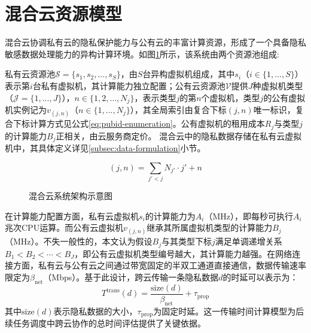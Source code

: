 \section{混合云资源模型}\label{sec:cloud-define}

混合云协调私有云的隐私保护能力与公有云的丰富计算资源，形成了一个具备隐私敏感数据处理能力的异构计算环境。如图\ref{fig:hybrid-arch}所示，该系统由两个资源池组成:

私有云资源池$\mathcal{S} = \{s_1, s_2, ..., s_S\}$，由$S$台异构虚拟机组成，其中$s_i$（$i \in \{1,...,S\}$）表示第$i$台私有虚拟机，其计算能力独立配置；公有云资源池$\mathcal{V}$提供$J$种虚拟机类型（$\mathcal{J} = \{1,...,J\}$），\(n \in \{1,2,\dots,N_j\}\)，表示类型\(j\)的第\(n\)个虚拟机，类型$j$的公有虚拟机实例记为$v_{(j,n)}$（$n \in \{1,...,N_j\}$），其全局索引由复合下标$(j,n)$唯一标识，复合下标计算方式见公式\eqref{eq:pubid-enumeration}。公有虚拟机的租用成本$R_j$与类型$j$的计算能力$B_j$正相关，由云服务商定价。
混合云中的隐私数据存储在私有云虚拟机中，其具体定义详见\ref{subsec:data-formulation}小节。

\begin{equation}
    (j,n) = \sum_{j'<j} N_{j'} \cdot j' + n
    \label{eq:pubid-enumeration}
\end{equation}

\begin{figure}[htb]
    \centering
    
    \caption{混合云系统架构示意图}
    \label{fig:hybrid-arch}
\end{figure}

在计算能力配置方面，私有云虚拟机$s_i$的计算能力为$A_i$（MHz），即每秒可执行$A_i$兆次CPU运算。而公有云虚拟机$v_{(j,n)}$继承其所属虚拟机类型的计算能力$B_j$（MHz）。不失一般性的，本文认为假设$B_j$与其类型下标$j$满足单调递增关系$B_1 < B_2 < \cdots < B_J$，即公有云虚拟机类型编号越大，其计算能力越强。在网络连接方面，私有云与公有云之间通过带宽固定的半双工通道直接通信，数据传输速率限定为$\beta_{\text{net}}$（Mbps）。基于此设计，跨云传输一条隐私数据\(d\)的时延可以表示为：
\begin{equation}
    T^{\text{trans}}(d) = \frac{\text{size}(d)}{\beta_{\text{net}}} + \tau_{\text{prop}}\label{eq:transmit-time}
\end{equation}
其中$\text{size}(d)$表示隐私数据的大小，$\tau_{\text{prop}}$为固定时延。这一传输时间计算模型为后续任务调度中跨云协作的总时间评估提供了关键依据。

